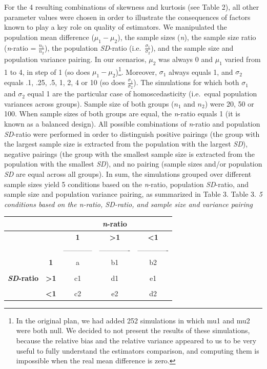 \documentclass[
  man,floatsintext]{apa6}
\begin{document}
For the 4 resulting combinations of skewness and kurtosis (see Table 2), all other parameter values were chosen in order to illustrate the consequences of factors known to play a key role on quality of estimators. We manipulated the population mean difference (\(\mu_1-\mu_2\)), the sample sizes (\emph{n}), the sample size ratio (\emph{n}-ratio = \(\frac{n_1}{n_2}\)), the population \emph{SD}-ratio (i.e.~\(\frac{\sigma_1}{\sigma_2}\)), and the sample size and population variance pairing. In our scenarios, \(\mu_2\) was always 0 and \(\mu_1\) varied from 1 to 4, in step of 1 (so does \(\mu_1-\mu_2\))\footnote{In the original plan, we had added 252 simulations in which mu1 and mu2 were both null. We decided to not present the results of these simulations, because the relative bias and the relative variance appeared to us to be very useful to fully understand the estimators comparison, and computing them is impossible when the real mean difference is zero. }. Moreover, \(\sigma_1\) always equals 1, and \(\sigma_2\) equals .1, .25, .5, 1, 2, 4 or 10 (so does \(\frac{\sigma_1}{\sigma_2}\)). The simulations for which both \(\sigma_1\) and \(\sigma_2\) equal 1 are the particular case of homoscedasticity (i.e.~equal population variances across groups). Sample size of both groups (\(n_1\) and \(n_2\)) were 20, 50 or 100. When sample sizes of both groups are equal, the \emph{n}-ratio equals 1 (it is known as a balanced design). All possible combinations of \emph{n}-ratio and population \emph{SD}-ratio were performed in order to distinguish positive pairings (the group with the largest sample size is extracted from the population with the largest \emph{SD}), negative pairings (the group with the smallest sample size is extracted from the population with the smallest \emph{SD}), and no pairing (sample sizes and/or population \emph{SD} are equal across all groups). In sum, the simulations grouped over different sample sizes yield 5 conditions based on the \emph{n}-ratio, population \emph{SD}-ratio, and sample size and population variance pairing, as summarized in Table 3.
Table 3.
\emph{5 conditions based on the n-ratio, SD-ratio, and sample size and variance pairing}

\begin{longtable}[]{@{}ccccc@{}}
\toprule
& & & \textbf{\emph{n}-ratio} &\tabularnewline
\midrule
\endhead
& & \textbf{1} & \textbf{\textgreater1} & \textbf{\textless1}\tabularnewline
& & ------------ & ------------- & -------------\tabularnewline
& \textbf{1} & a & b1 & b2\tabularnewline
& & & &\tabularnewline
\textbf{\emph{SD}-ratio} & \textbf{\textgreater1} & c1 & d1 & e1\tabularnewline
& & & &\tabularnewline
& \textbf{\textless1} & c2 & e2 & d2\tabularnewline
\bottomrule
\end{longtable}
\end{document}
